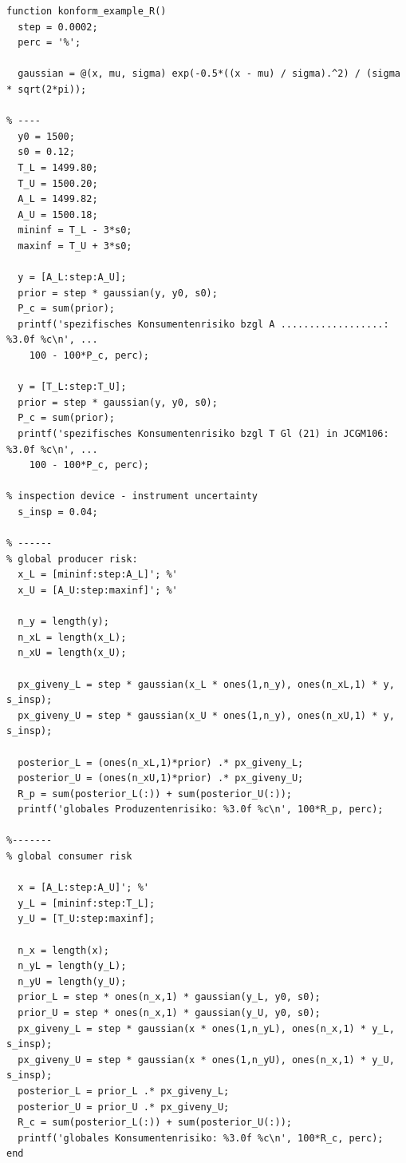 \begin{lstlisting}[style=Matlab]
  function konform_example_R()
  step = 0.0002;
  perc = '%';

  gaussian = @(x, mu, sigma) exp(-0.5*((x - mu) / sigma).^2) / (sigma * sqrt(2*pi));

% ----
  y0 = 1500;
  s0 = 0.12;
  T_L = 1499.80;
  T_U = 1500.20;
  A_L = 1499.82;
  A_U = 1500.18;
  mininf = T_L - 3*s0;
  maxinf = T_U + 3*s0;

  y = [A_L:step:A_U];
  prior = step * gaussian(y, y0, s0);
  P_c = sum(prior);
  printf('spezifisches Konsumentenrisiko bzgl A ..................: %3.0f %c\n', ...
    100 - 100*P_c, perc);

  y = [T_L:step:T_U];
  prior = step * gaussian(y, y0, s0);
  P_c = sum(prior);
  printf('spezifisches Konsumentenrisiko bzgl T Gl (21) in JCGM106: %3.0f %c\n', ...
    100 - 100*P_c, perc);

% inspection device - instrument uncertainty
  s_insp = 0.04;

% ------
% global producer risk:
  x_L = [mininf:step:A_L]'; %'
  x_U = [A_U:step:maxinf]'; %'

  n_y = length(y);
  n_xL = length(x_L);
  n_xU = length(x_U);

  px_giveny_L = step * gaussian(x_L * ones(1,n_y), ones(n_xL,1) * y, s_insp);
  px_giveny_U = step * gaussian(x_U * ones(1,n_y), ones(n_xU,1) * y, s_insp);

  posterior_L = (ones(n_xL,1)*prior) .* px_giveny_L;
  posterior_U = (ones(n_xU,1)*prior) .* px_giveny_U;
  R_p = sum(posterior_L(:)) + sum(posterior_U(:));
  printf('globales Produzentenrisiko: %3.0f %c\n', 100*R_p, perc);

%-------
% global consumer risk

  x = [A_L:step:A_U]'; %'
  y_L = [mininf:step:T_L];
  y_U = [T_U:step:maxinf];

  n_x = length(x);
  n_yL = length(y_L);
  n_yU = length(y_U);
  prior_L = step * ones(n_x,1) * gaussian(y_L, y0, s0);
  prior_U = step * ones(n_x,1) * gaussian(y_U, y0, s0);
  px_giveny_L = step * gaussian(x * ones(1,n_yL), ones(n_x,1) * y_L, s_insp);
  px_giveny_U = step * gaussian(x * ones(1,n_yU), ones(n_x,1) * y_U, s_insp);
  posterior_L = prior_L .* px_giveny_L;
  posterior_U = prior_U .* px_giveny_U;
  R_c = sum(posterior_L(:)) + sum(posterior_U(:));
  printf('globales Konsumentenrisiko: %3.0f %c\n', 100*R_c, perc);
end

\end{lstlisting}
